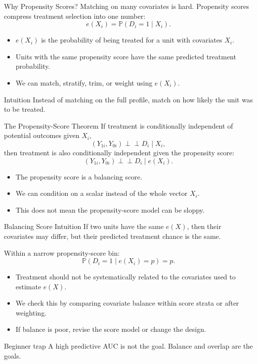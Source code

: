 \documentclass[11pt,aspectratio=169]{beamer}
\newcommand{\Prob}{\mathbb{P}}
\newcommand{\indep}{\perp\!\!\!\perp}
\newcommand{\derivbutton}[1]{\vspace{0.4em}\hfill\hyperlink{app:#1}{\beamerbutton{Appendix details}}}
\begin{document}
\begin{frame}{Why Propensity Scores?}
  Matching on many covariates is hard. Propensity scores compress treatment selection into one number:
  \[
    e(X_i)=\Prob(D_i=1\mid X_i).
  \]
  \begin{itemize}
    \item \(e(X_i)\) is the probability of being treated for a unit with covariates \(X_i\).
    \item Units with the same propensity score have the same predicted treatment probability.
    \item We can match, stratify, trim, or weight using \(e(X_i)\).
  \end{itemize}
  \begin{block}{Intuition}
    Instead of matching on the full profile, match on how likely the unit was to be treated.
  \end{block}
\end{frame}

\begin{frame}{The Propensity-Score Theorem}
  \hypertarget{main:pscore-theorem}{}
  If treatment is conditionally independent of potential outcomes given \(X_i\),
  \[
    (Y_{1i},Y_{0i})\indep D_i \mid X_i,
  \]
  then treatment is also conditionally independent given the propensity score:
  \[
    (Y_{1i},Y_{0i})\indep D_i \mid e(X_i).
  \]
  \begin{itemize}
    \item The propensity score is a balancing score.
    \item We can condition on a scalar instead of the whole vector \(X_i\).
    \item This does not mean the propensity-score model can be sloppy.
  \end{itemize}
  \derivbutton{pscore-proof}
\end{frame}

\begin{frame}{Balancing Score Intuition}
  If two units have the same \(e(X)\), then their covariates may differ, but their predicted treatment chance is the same.
  \vspace{0.3em}

  Within a narrow propensity-score bin:
  \[
    \Prob(D_i=1\mid e(X_i)=p)=p.
  \]
  \begin{itemize}
    \item Treatment should not be systematically related to the covariates used to estimate \(e(X)\).
    \item We check this by comparing covariate balance within score strata or after weighting.
    \item If balance is poor, revise the score model or change the design.
  \end{itemize}
  \begin{block}{Beginner trap}
    A high predictive AUC is not the goal. Balance and overlap are the goals.
  \end{block}
\end{frame}
\end{document}
